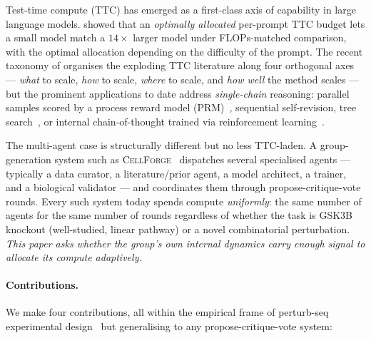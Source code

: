 \documentclass[10pt,a4paper]{article}
\begin{document}
Test-time compute (TTC) has emerged as a first-class axis of capability in
large language models. \citet{snell2024scaling} showed that an
\emph{optimally allocated} per-prompt TTC budget lets a small model match a
$14\times$ larger model under FLOPs-matched comparison, with the optimal
allocation depending on the difficulty of the prompt. The recent taxonomy of
\citet{zhang2025ttssurvey} organises the exploding TTC literature along four
orthogonal axes --- \emph{what} to scale, \emph{how} to scale, \emph{where} to
scale, and \emph{how well} the method scales --- but the prominent
applications to date address \emph{single-chain} reasoning: parallel samples
scored by a process reward model (PRM)~\citep{lightman2024prm}, sequential
self-revision, tree search~\citep{yao2023tot}, or internal chain-of-thought
trained via reinforcement learning~\citep{deepseek2025r1,muennighoff2025s1}.

The multi-agent case is structurally different but no less TTC-laden. A
group-generation system such as \textsc{CellForge}~\citep{chen2025cellforge}
dispatches several specialised agents --- typically a data curator, a
literature/prior agent, a model architect, a trainer, and a biological
validator --- and coordinates them through propose-critique-vote rounds. Every
such system today spends compute \emph{uniformly}: the same number of agents
for the same number of rounds regardless of whether the task is GSK3B
knockout (well-studied, linear pathway) or a novel combinatorial
perturbation. \emph{This paper asks whether the group's own internal
dynamics carry enough signal to allocate its compute adaptively.}

\paragraph{Contributions.} We make four contributions, all within the
empirical frame of perturb-seq experimental design~\citep{norman2019perturbseq,%
adamson2016perturbseq} but generalising to any propose-critique-vote system:
\end{document}
